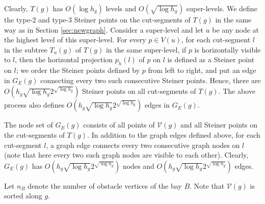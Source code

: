 \documentclass[english,runningheads,11pt]{llncs}
\def\calV{\mathcal{V}}
\begin{document}
Clearly, $T(g)$ has $O(\log h_g)$ levels and $O(\sqrt{\log h_g})$
super-levels. We define the type-2 and type-3 Steiner points on the cut-segments of $T(g)$
in the same way as in Section \ref{sec:newgraph}.
Consider a super-level and let $u$ be any node at the highest level of this super-level. For
every $p\in V(u)$, for each cut-segment $l$ in the subtree $T_u(g)$ of $T(g)$ in the same super-level,
if $p$ is horizontally visible to $l$, then the horizontal projection $p_h(l)$ of $p$ on $l$ is defined as a Steiner point on $l$; we order the Steiner points defined by $p$ from left to right,
and put an edge in $G_E(g)$ connecting every two such consecutive Steiner points.
Hence, there are $O(h_g\sqrt{\log h_g}2^{\sqrt{\log h_g}})$ Steiner points on all cut-segments
of $T(g)$. The above process also defines $O(h_g\sqrt{\log h_g}2^{\sqrt{\log h_g}})$ edges in $G_E(g)$.

The node set of $G_E(g)$ consists of all points of $\calV(g)$ and all Steiner points on the
cut-segments of $T(g)$. In addition to the graph edges defined above, for each cut-segment $l$,
a graph edge connects every two consecutive graph nodes on $l$
(note that here every two such graph nodes are visible to each other).
Clearly, $G_E(g)$ has $O(h_g \sqrt{\log h_g}2^{\sqrt{\log h_g}})$ nodes and  $O(h_g \sqrt{\log h_g}2^{\sqrt{\log h_g}})$ edges.

Let $n_B$ denote the number of obstacle vertices of the bay $B$.
Note that $\calV(g)$ is sorted along $g$.
\end{document}
